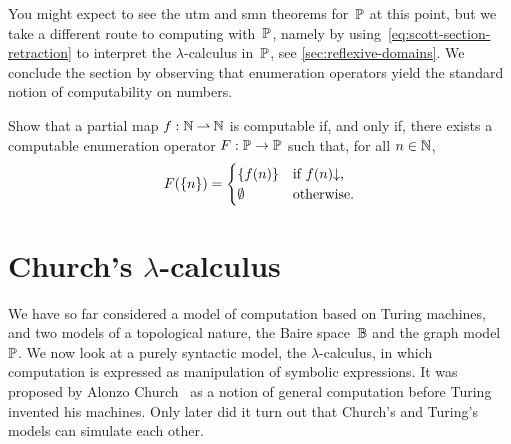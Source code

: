 You might expect to see the utm and smn theorems for~$\mathbb{P}$ at this point, but we take a different route to computing with~$\mathbb{P}$, namely by using~\eqref{eq:scott-section-retraction} to interpret the $\lambda$-calculus in~$\mathbb{P}$, see \cref{sec:reflexive-domains}. We conclude the section by observing that enumeration operators yield the standard notion of computability on numbers.

\begin{exercise}
  Show that a partial map $f : \mathbb{N} \mathbin{\rightharpoonup} \mathbb{N}$ is computable if, and only if, there exists a computable enumeration operator $F : \mathbb{P} \to \mathbb{P}$ such that, for all $n \in \mathbb{N}$,
  \begin{equation*}
    F(\{n\}) =
    \begin{cases}
      \{f(n)\} & \text{if $f(n){\downarrow}$,} \\
      \emptyset & \text{otherwise.}
    \end{cases}
  \end{equation*}
\end{exercise}


\section[\texorpdfstring%
{Church's $\lambda$-calculus}%
{Church's lambda-calculus}%
]{Church's $\lambda$-calculus}
\label{sec:lambda-calculus}

We have so far considered a model of computation based on Turing
machines, and two models of a topological nature, the Baire
space~$\mathbb{B}$ and the graph model~$\mathbb{P}$. We now look at a purely
syntactic model, the $\lambda$-calculus, in which computation is expressed as manipulation of
symbolic expressions.
It was proposed by Alonzo Church~ as a
notion of general computation before Turing invented his machines. Only later did it turn out that Church's and Turing's models can simulate each other.

